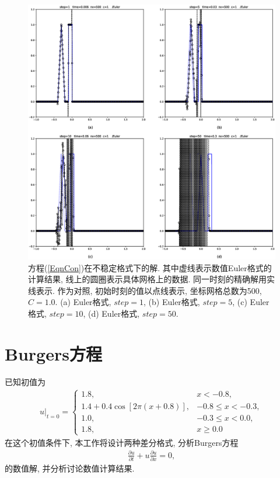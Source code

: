 \documentclass[10.5pt
]{article}
\begin{document}
\begin{figure}[htb]
	\centering
	\includegraphics[width=\textwidth]{hw2_1_euler.eps}
	\caption{方程(\ref{EqnCon})在不稳定格式下的解. 其中虚线表示数值Euler格式的计算结果, 线上的圆圈表示具体网格上的数据. 同一时刻的精确解用实线表示. 作为对照, 初始时刻的值以点线表示, 坐标网格总数为500, $C = 1.0$. (a) Euler格式, $step = 1$, (b)  Euler格式, $step = 5$, (c)  Euler格式, $step = 10$, (d) Euler格式, $step = 50$.} \label{fig14}
\end{figure}



\section{Burgers方程}
已知初值为
\begin{align}
u|_{t=0} = \left\{\begin{array}{ll} 1.8, & x < -0.8,
\\
1.4 + 0.4 \cos\left[2 \pi (x + 0.8) \right], & -0.8 \le x < -0.3,
\\
1.0, & -0.3 \le x < 0.0,
\\
1.8, & x \ge 0.0
\end{array} \right.
\end{align}
在这个初值条件下, 本工作将设计两种差分格式, 分析Burgers方程
\begin{align}
\frac{\partial u}{\partial t} + u \frac{\partial u}{\partial x} = 0, \label{EqnBurgers}
\end{align}
的数值解, 并分析讨论数值计算结果. 
\end{document}
